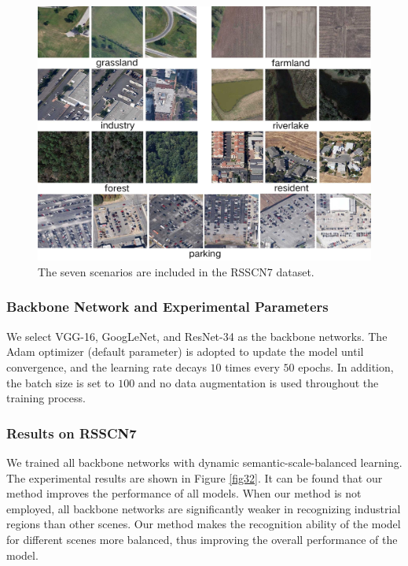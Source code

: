 \documentclass[10pt]{article} %
\begin{document}
\begin{figure}[h]
\begin{center}
\includegraphics[width=0.9\columnwidth]{fig31}
\vskip -0.12in
\caption{The seven scenarios are included in the RSSCN7 dataset.}
\label{fig31}
\end{center}
\vskip -0.3in
\end{figure}

\subsubsection{Backbone Network and Experimental Parameters}
We select VGG-16, GoogLeNet, and ResNet-34 as the backbone networks. The Adam optimizer (default parameter) is adopted to update the model until convergence, and the learning rate decays $10$ times every $50$ epochs. In addition, the batch size is set to $100$ and no data augmentation is used throughout the training process.


\subsubsection{Results on RSSCN7} 

We trained all backbone networks with dynamic semantic-scale-balanced learning. The experimental results are shown in Figure \ref{fig32}. It can be found that our method improves the performance of all models. When our method is not employed, all backbone networks are significantly weaker in recognizing industrial regions than other scenes. Our method makes the recognition ability of the model for different scenes more balanced, thus improving the overall performance of the model. 
\end{document}

